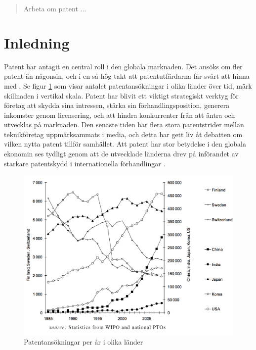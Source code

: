 
\begin{abstract}
	Arbeta om patent ...
\end{abstract}	
	
	
\section{Inledning}

Patent har antagit en central roll i den globala marknaden.
Det ansöks om fler patent än någonsin, och i en så hög takt att patentutfärdarna
får svårt att hinna med \cite{uspto_number}. Se figur \ref{fig:holg} som visar antalet patentansökningar i olika länder över tid, märk skillnaden i vertikal skala.
Patent har blivit ett viktigt strategiskt verktyg för företag att skydda sina
intressen, stärka sin förhandlingsposition, generera inkomster genom
licensering, och att hindra konkurrenter från att äntra och utvecklas på
marknaden. 
Den senaste tiden har flera stora patentstrider mellan teknikföretag
uppmärksammats i media, och detta har gett liv åt debatten om vilken nytta
patent tillför samhället.
Att patent har stor betydelse i den globala ekonomin ses tydligt genom att
de utvecklade länderna drev på införandet av starkare patentskydd i
internationella förhandlingar \cite{ove}. 


\begin{figure}[h!]
  \centering
  \includegraphics[width=1.15\textwidth]{../holg.png}
  
  \caption{Patentansökningar per år i olika länder\cite{holg}}
  \label{fig:holg}
\end{figure}



